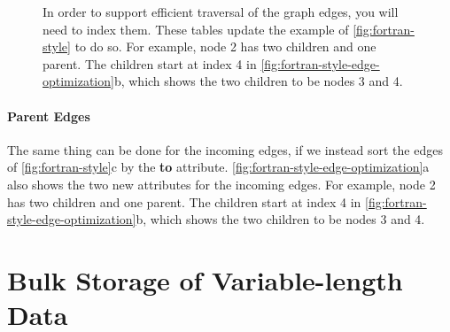 \begin{figure}
\caption{In order to support efficient traversal of the graph edges, you will
need to index them. These tables update the example of
\autoref{fig:fortran-style} to do so.  For example, node 2 has two children and
one parent. The children start at index 4 in
\autoref{fig:fortran-style-edge-optimization}b, which shows the two children to
be nodes 3 and 4.}
\label{fig:fortran-style-edge-optimization}
\end{figure}

\paragraph{Parent Edges}
The same thing can be done for the incoming edges, if we instead sort the edges
of \autoref{fig:fortran-style}c by the \textbf{to} attribute.
\autoref{fig:fortran-style-edge-optimization}a also shows the two new attributes
for the incoming edges.  For example, node 2 has two children and one parent.
The children start at index 4 in \autoref{fig:fortran-style-edge-optimization}b,
which shows the two children to be nodes 3 and 4.

\section{Bulk Storage of Variable-length Data} %
\label{sec:bulk-sharing-pool}

